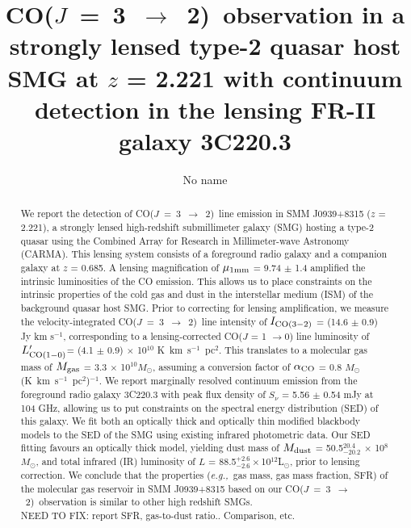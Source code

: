 \documentclass[twocolumn,apj,numberedappendix]{emulateapj}
\newcommand{\Msun}{\mbox{$M_{\odot}$}}
\newcommand{\Lsun}{\mbox{L$_{\odot}$}}
\newcommand{\rarr}{$\rightarrow$}
\newcommand{\CO}{\mbox{CO($J$ = 3 $\rightarrow$ 2) }}
\newcommand{\Lp}{\mbox{$L^{\prime}_{\rm CO(1-0)}$}}
\newcommand{\LpU}{\mbox{K km s$^{-1}$ pc$^2$}}
\newcommand{\eg}{{\sl e.g.,~}}
\newcommand{\pmOne}{$^{-1}$}
\begin{document}
\title{\CO observation in a strongly lensed type-2 quasar host SMG at $z$ = 2.221 with
continuum detection in the lensing FR-II galaxy 3C220.3}
\author{No name}

\begin{abstract}
We report the detection of \CO line emission in SMM J0939+8315 ($z$ = 2.221), a
strongly lensed high-redshift submillimeter galaxy (SMG) hosting a type-2 quasar using
the Combined Array for Research in Millimeter-wave Astronomy (CARMA). This lensing system consists of a
foreground radio galaxy and a companion galaxy at $z$ = 0.685. A lensing magnification of $\mu_{\rm 1 mm}$ = 9.74 $\pm$ 1.4 amplified the intrinsic luminosities of the CO emission. This allows us to place constraints on the intrinsic properties
of the cold gas and dust in the interstellar medium (ISM) of the background quasar host SMG. Prior to correcting for lensing 
amplification, we measure the
velocity-integrated \CO line intensity of $I_{\rm CO(3-2)}$ = (14.6 $\pm$ 0.9) Jy km s\pmOne,
corresponding to a lensing-corrected CO($J$ = 1 \rarr 0) line luminosity of \Lp = (4.1 $\pm$ 
0.9) $\times$ 10$^{10}$ \LpU. This
translates to a molecular gas mass of $M_{\rm gas}$ = 3.3 $\times$ 10$^{10}M_\odot$, assuming a conversion
factor of $\alpha_{\rm CO}$ = 0.8 \Msun (\LpU)\pmOne. We report marginally resolved continuum 
emission from the foreground radio galaxy 3C220.3 with peak flux density of $S_\nu$ = 5.56 $\pm$ 0.54 mJy
 at 104 GHz, allowing us to put constraints on the spectral energy distribution (SED) of this galaxy. We 
fit
 both an optically thick and optically thin modified blackbody models to the SED of the SMG using existing
infrared photometric data. Our SED fitting favours an optically thick model, yielding dust mass of $M_{\rm
dust}$ = 50.5$^{20.4}_{-20.2}$ $\times$ 10$^8$\Msun, and total infrared (IR) luminosity of $L$ = 88.5$^{+2.6}
_{-2.6}\times$10$^{12}$\Lsun, prior to lensing correction. We conclude that the properties (\eg gas mass, gas mass 
fraction, SFR) of the molecular gas reservoir in SMM
J0939+8315 based on our \CO observation is similar to other high redshift
SMGs. \\
NEED TO  FIX: 
report SFR, gas-to-dust ratio.. Comparison, etc. 
\end{abstract}
\end{document}
